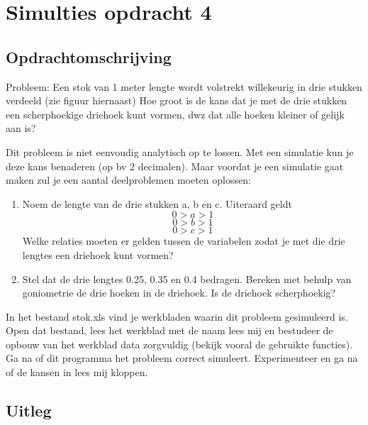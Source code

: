 \documentclass{article}
\begin{document}



\section{Simulties opdracht 4}
\label{sec:sample_main}

\subsection{Opdrachtomschrijving}
\label{subsec:sample_opdrom}

Probleem:
Een stok van 1 meter lengte wordt volstrekt willekeurig in drie stukken verdeeld (zie figuur hiernaast) Hoe groot is de kans dat je met de drie stukken een scherphoekige driehoek kunt vormen, dwz dat alle hoeken kleiner of gelijk aan  is? 

Dit probleem is niet eenvoudig analytisch op te lossen. Met een simulatie kun je deze kans benaderen (op bv 2 decimalen). Maar voordat je een simulatie gaat maken zul je een aantal deelproblemen moeten oplossen:


\begin{enumerate}[label=(\Alph*)]

\item Noem de lengte van de drie stukken a, b en c. Uiteraard geldt \begin{equation} 0 > a >1\end{equation} \begin{equation} 0 > b >1\end{equation} \begin{equation} 0 > c >1\end{equation} Welke relaties moeten er gelden tussen de variabelen zodat je met die drie lengtes een driehoek kunt vormen?
\item Stel dat de drie lengtes 0.25, 0.35 en 0.4 bedragen. Bereken met behulp van goniometrie de drie hoeken in de driehoek. Is de driehoek scherphoekig?

\end{enumerate}

In het bestand stok.xls vind je werkbladen waarin dit probleem gesimuleerd is. Open dat bestand, lees het werkblad met de naam lees mij en bestudeer de opbouw van het werkblad data zorgvuldig (bekijk vooral de gebruikte functies). Ga na of dit programma het probleem correct simuleert. Experimenteer en ga na of de kansen in lees mij kloppen.

\newpage
\subsection{Uitleg}
\label{subsec:sample_uitv}
\end{document}
